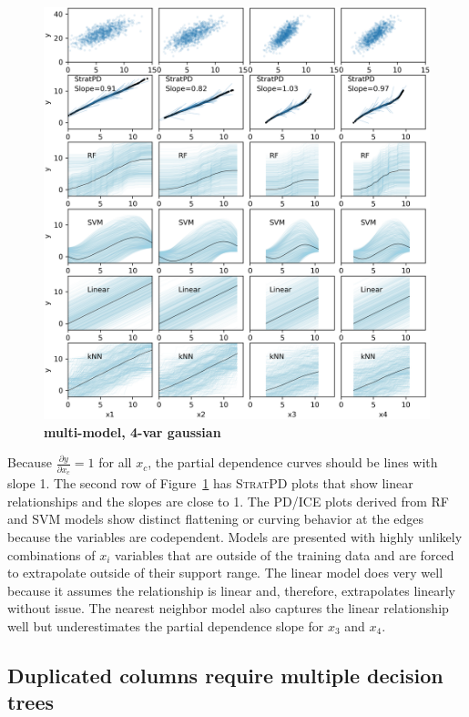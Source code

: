 \documentclass[12pt]{article}
\newcommand{\figref}[1]{Figure~\ref{#1}}
\newcommand{\spd}{\fontfamily{cmr}\textsc{\small StratPD}}
\begin{document}
\begin{figure}[htbp]
\begin{center}
\includegraphics[scale=0.6]{images/multivar_multimodel_normal.png}
\caption{{\bf  multi-model, 4-var gaussian}}
\label{fig:4var}
\end{center}
\end{figure}

Because $\frac{\partial y}{\partial x_{c}} = 1$ for all $x_c$, the partial dependence curves should be lines with slope 1.  The second row of \figref{fig:4var} has \spd{} plots that show linear relationships and the slopes are close to 1.  The PD/ICE plots derived from RF and SVM models show distinct flattening or curving behavior at the edges because the variables are codependent. Models are presented with highly unlikely combinations of $x_i$ variables that are outside of the training data and are forced to extrapolate outside of their support range.  The linear model does very well because it assumes the relationship is linear and, therefore, extrapolates linearly without issue. The nearest neighbor model also captures the linear relationship well but underestimates the partial dependence slope for $x_3$ and $x_4$.
 
\subsection{Duplicated columns require multiple decision trees}\label{sec:dup}
\end{document}
